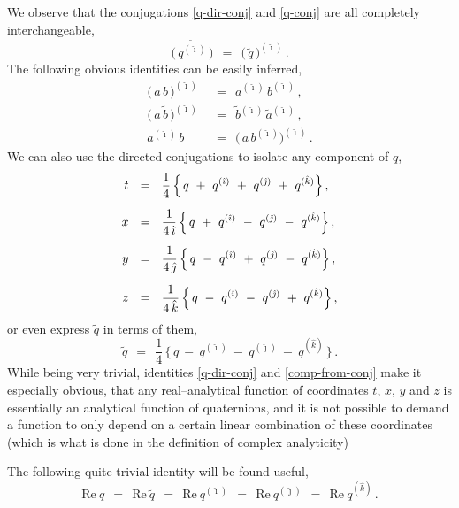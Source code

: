 \documentclass[epsfig,12pt]{article}
\newcommand{\wt}{\widetilde}
\newcommand{\ii}{\hat\imath}
\newcommand{\jj}{\hat\jmath}
\newcommand{\kk}{\hat k}
\begin{document}
	We observe that the conjugations \eqref{q-dir-conj} and \eqref{q-conj} are all completely interchangeable,
\[
	\overset{\wt{~~~}}{\big(\, q^{(\ii)} \,\big)}	~~=~~	\big(\, \wt{q} \,\big)^{(\ii)}\,.
\]
	The following obvious identities can be easily inferred,
\begin{align*}
%
	\big(\, a\, b \,\big)^{(\ii)}	& ~~=~~		a^{(\ii)}\, b^{(\ii)}\,,
	\\[2mm]
%
	\big(\, a\, \wt b \,)^{(\ii)}	& ~~=~~		\wt b{}^{(\ii)}\, \wt a{}^{(\ii)}\,,
	\\[2mm]
%
	a^{(\ii)}\, b~~~		& ~~=~~		\big(\, a\, b^{(\ii)} \big)^{(\ii)}\,.
\end{align*}
	We can also use the directed conjugations to isolate any component of $ q $,
\begin{align}
%
\notag
	t	& ~~=~~	\frac 1 4\, \Big\{\,  q  ~+~  q^{(\ii)}  ~+~  q^{(\jj)}  ~+~  q^{(\kk)} \Big\}\,,
	\\[2mm]
%
\notag
	x	& ~~=~~	\frac{1}{4\,\ii}\, \Big\{\,  q  ~+~  q^{(\ii)}  ~-~  q^{(\jj)}  ~-~  q^{(\kk)} \Big\}\,,
	\\[2mm]
%
\label{comp-from-conj}
	y	& ~~=~~	\frac{1}{4\,\jj}\, \Big\{\,  q  ~-~  q^{(\ii)}  ~+~  q^{(\jj)}  ~-~  q^{(\kk)} \Big\}\,,
	\\[2mm]
%
\notag
	z	& ~~=~~	\frac{1}{4\,\kk}\, \Big\{\,  q  ~-~  q^{(\ii)}  ~-~  q^{(\jj)}  ~+~  q^{(\kk)} \Big\}\,,
\end{align}
	or even express $ \wt{q} $ in terms of them,
\[
	\wt q 	~~=~~ 	\frac 1 4\, \Big\{\,  q  ~-~  q^{(\ii)}  ~-~  q^{(\jj)}  ~-~  q^{(\kk)}  \,\}\,.
\]	
	While being very trivial, identities \eqref{q-dir-conj} and \eqref{comp-from-conj} make it especially obvious,
	that any real--analytical function of coordinates $ t $, $ x $, $ y $ and $ z $
	is essentially an analytical function of quaternions,
	and it is not possible to demand a function to only depend on a certain linear combination of these coordinates
	(which is what is done in the definition of complex analyticity)

	The following quite trivial identity will be found useful,
\[
%
	\text{Re}~ q	~~=~~	\text{Re}~ \wt q	~~=~~	
	\text{Re}~ q^{(\ii)}	~~=~~	\text{Re}~ q^{(\jj)}	~~=~~	\text{Re}~ q^{(\kk)}\,.
\]


\end{document}
